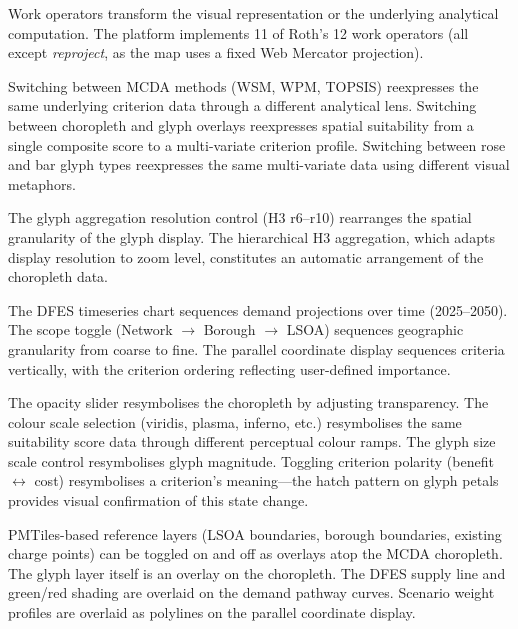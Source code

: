 Work operators transform the visual representation or the underlying analytical computation. The platform implements 11 of Roth's 12 work operators (all except \emph{reproject}, as the map uses a fixed Web Mercator projection).

\begin{description}[nosep, leftmargin=0pt, itemindent=0pt]
    \item[Reexpress.] Switching between MCDA methods (WSM, WPM, TOPSIS) reexpresses the same underlying criterion data through a different analytical lens. Switching between choropleth and glyph overlays reexpresses spatial suitability from a single composite score to a multi-variate criterion profile. Switching between rose and bar glyph types reexpresses the same multi-variate data using different visual metaphors.

    \item[Arrange.] The glyph aggregation resolution control (H3 r6--r10) rearranges the spatial granularity of the glyph display. The hierarchical H3 aggregation, which adapts display resolution to zoom level, constitutes an automatic arrangement of the choropleth data.

    \item[Sequence.] The DFES timeseries chart sequences demand projections over time (2025--2050). The scope toggle (Network $\rightarrow$ Borough $\rightarrow$ LSOA) sequences geographic granularity from coarse to fine. The parallel coordinate display sequences criteria vertically, with the criterion ordering reflecting user-defined importance.

    \item[Resymbolize.] The opacity slider resymbolises the choropleth by adjusting transparency. The colour scale selection (viridis, plasma, inferno, etc.) resymbolises the same suitability score data through different perceptual colour ramps. The glyph size scale control resymbolises glyph magnitude. Toggling criterion polarity (benefit $\leftrightarrow$ cost) resymbolises a criterion's meaning—the hatch pattern on glyph petals provides visual confirmation of this state change.

    \item[Overlay.] PMTiles-based reference layers (LSOA boundaries, borough boundaries, existing charge points) can be toggled on and off as overlays atop the MCDA choropleth. The glyph layer itself is an overlay on the choropleth. The DFES supply line and green/red shading are overlaid on the demand pathway curves. Scenario weight profiles are overlaid as polylines on the parallel coordinate display.


\end{description}
